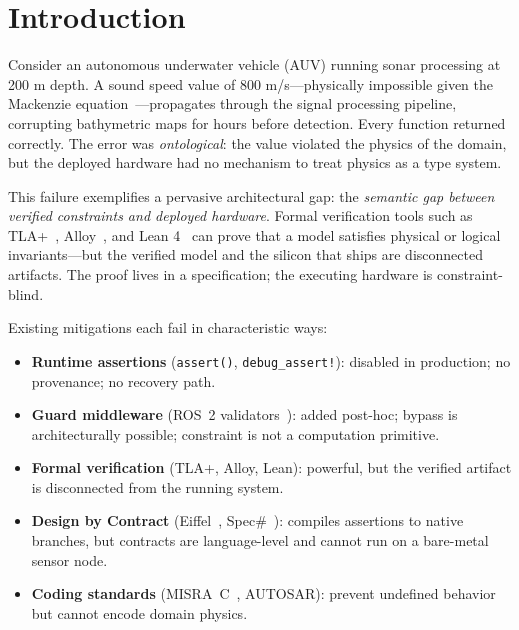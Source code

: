 \documentclass[sigplan,10pt,review]{acmart}
\begin{document}

\maketitle

\section{Introduction}
\label{sec:intro}

Consider an autonomous underwater vehicle (AUV) running sonar processing at 200 m
depth. A sound speed value of 800 m/s---physically impossible given the Mackenzie
equation~\cite{mackenzie1981}---propagates through the signal processing pipeline,
corrupting bathymetric maps for hours before detection. Every function returned
correctly. The error was \emph{ontological}: the value violated the physics of the
domain, but the deployed hardware had no mechanism to treat physics as a type system.

This failure exemplifies a pervasive architectural gap: the \emph{semantic gap between
verified constraints and deployed hardware}. Formal verification tools such as
TLA+~\cite{lamport2002}, Alloy~\cite{jackson2012}, and Lean 4~\cite{demoura2021}
can prove that a model satisfies physical or logical invariants---but the verified
model and the silicon that ships are disconnected artifacts. The proof lives in a
specification; the executing hardware is constraint-blind.

Existing mitigations each fail in characteristic ways:
\begin{itemize}
  \item \textbf{Runtime assertions} (\texttt{assert()}, \texttt{debug\_assert!}):
    disabled in production; no provenance; no recovery path.
  \item \textbf{Guard middleware} (ROS~2 validators~\cite{macenski2022}): added
    post-hoc; bypass is architecturally possible; constraint is not a computation primitive.
  \item \textbf{Formal verification} (TLA+, Alloy, Lean): powerful, but the verified
    artifact is disconnected from the running system.
  \item \textbf{Design by Contract} (Eiffel~\cite{meyer1992}, Spec\#~\cite{barnett2011}):
    compiles assertions to native branches, but contracts are language-level and
    cannot run on a bare-metal sensor node.
  \item \textbf{Coding standards} (MISRA~C~\cite{misra2012}, AUTOSAR): prevent
    undefined behavior but cannot encode domain physics.
\end{itemize}
\end{document}
